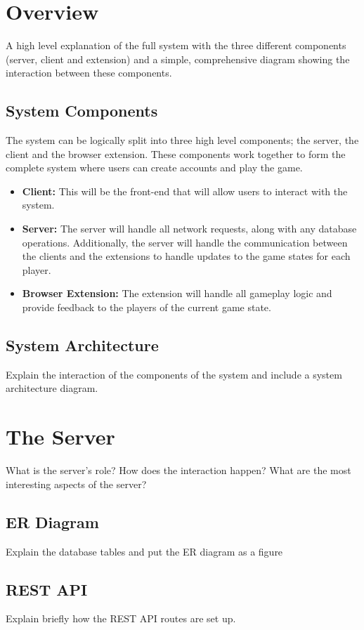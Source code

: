 \documentclass{l4proj}
\begin{document}
\section{Overview}
A high level explanation of the full system with the three different components (server, client and extension) and a simple, comprehensive diagram showing the interaction between these components.
\subsection{System Components}
The system can be logically split into three high level components; the server, the client and the browser extension. These components work together to form the complete system where users can create accounts and play the game.
\begin{itemize}
    \item
    \textbf{Client:} This will be the front-end that will allow users to interact with the system.
    \item
    \textbf{Server:} The server will handle all network requests, along with any database operations. Additionally, the server will handle the communication between the clients and the extensions to handle updates to the game states for each player.
    \item
    \textbf{Browser Extension:} The extension will handle all gameplay logic and provide feedback to the players of the current game state. 
\end{itemize}

\subsection{System Architecture}
Explain the interaction of the components of the system and include a system architecture diagram.

\section{The Server}
What is the server's role? How does the interaction happen? What are the most interesting aspects of the server?

\subsection{ER Diagram}
Explain the database tables and put the ER diagram as a figure

\subsection{REST API}
Explain briefly how the REST API routes are set up.
\end{document}
